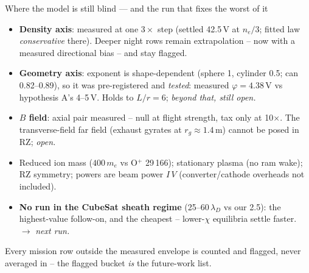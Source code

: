 \documentclass[10pt,aspectratio=169]{beamer}
\begin{document}
\begin{frame}{Where the model is still blind --- and the run that fixes the worst of it}
  \begin{itemize}\small
    \item \textbf{Density axis}: measured at one $3\times$ step (settled
          42.5\,V at $n_e/3$; fitted law \emph{conservative} there). Deeper
          night rows remain extrapolation -- now with a measured
          directional bias -- and stay flagged.
    \item \textbf{Geometry axis}: exponent is shape-dependent (sphere 1,
          cylinder 0.5; can 0.82--0.89), so it was pre-registered and
          \emph{tested}: measured $\varphi = 4.38$\,V vs hypothesis A's
          4--5\,V. Holds to $L/r = 6$; \emph{beyond that, still open.}
    \item \textbf{$B$ field}: axial pair measured -- null at flight
          strength, tax only at 10$\times$. The transverse-field far field
          (exhaust gyrates at $r_g \approx 1.4$\,m) cannot be posed in RZ;
          \emph{open.}
    \item Reduced ion mass ($400\,m_e$ vs O$^+$ 29\,166); stationary plasma
          (no ram wake); RZ symmetry; powers are beam
          power $I\,V$ (converter/cathode overheads not included).
    \item \textbf{No run in the CubeSat sheath regime} (25--60\,$\lambda_D$
          vs our 2.5): the highest-value follow-on, and the cheapest --
          lower-$\chi$ equilibria settle faster. $\to$ \emph{next run.}
  \end{itemize}
  \vspace{1ex}
  \small Every mission row outside the measured envelope is counted and
  flagged, never averaged in -- the flagged bucket \emph{is} the future-work
  list.
\end{frame}
\end{document}
